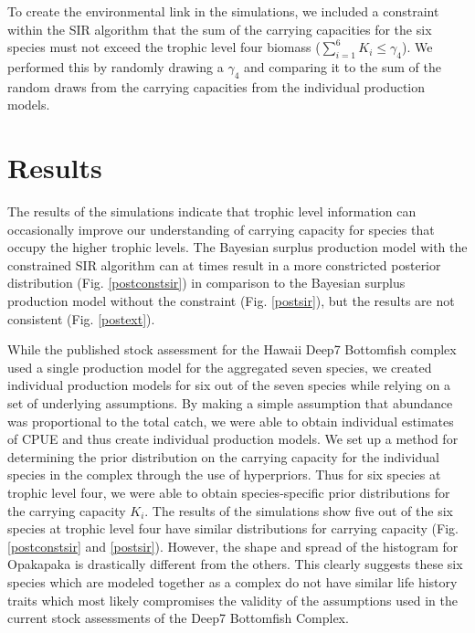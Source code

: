 \documentclass[oneside,12pt,final]{sty/ucthesis-CA2012}
\begin{document}
\begin{mainmatter}
\vspace{5mm}

To create the environmental link in the simulations, we included a constraint within the SIR algorithm that the sum of the carrying capacities for the six species must not exceed the trophic level four biomass ($\sum_{i=1}^{6} K_i \le \gamma_4$). We performed this by randomly drawing a $\gamma_4$ and comparing it to the sum of the random draws from the carrying capacities from the individual production models.


\section*{Results}
The results of the simulations  indicate that trophic level information can occasionally improve our understanding of carrying capacity for species that occupy the higher trophic levels. The Bayesian surplus production model with the constrained SIR algorithm can at times result in a more constricted posterior distribution (Fig. \ref{postconstsir}) in comparison to the Bayesian surplus production model without the constraint (Fig. \ref{postsir}), but the results are not consistent (Fig. \ref{postext}). 

\vspace{5mm}

While the published stock assessment for the Hawaii Deep7 Bottomfish complex used a single production model for the aggregated seven species, we created individual production models for six out of the seven species while relying on a set of underlying assumptions. By making a simple assumption that abundance was proportional to the total catch, we were able to obtain individual estimates of CPUE and thus create individual production models. We set up a method for determining the prior distribution on the carrying capacity for the individual species in the complex through the use of hyperpriors. Thus for six species at trophic level four, we were able to obtain species-specific prior distributions for the carrying capacity $K_i$. The results of the simulations show five out of the six species at trophic level four have similar distributions for carrying capacity (Fig. \ref{postconstsir} and \ref{postsir}). However, the shape and spread of the histogram for Opakapaka is drastically different from the others. This clearly suggests these six species which are modeled together as a complex do not have similar life history traits which most likely compromises the validity of the assumptions used in the current stock assessments of the Deep7 Bottomfish Complex. 


\end{mainmatter}
\end{document}
